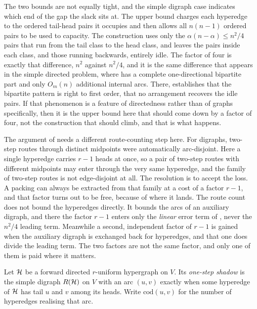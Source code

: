 The two bounds are not equally tight, and the simple digraph case indicates
which end of the gap the slack sits at. The upper bound charges each hyperedge
to the ordered tail-head pairs it occupies and then allows all $n(n-1)$ ordered pairs to be used to
capacity. The construction uses only the $\alpha(n-\alpha) \le n^2/4$ pairs that
run from the tail class to the head class, and leaves the pairs inside each
class, and those running backwards, entirely idle. The factor of four is exactly
that difference, $n^2$ against $n^2/4$, and it is the same difference that
appears in the simple directed problem, where 
has a complete one-directional bipartite part and only $O_m(n)$ additional internal arcs. There, 
establishes that the bipartite pattern is right to first order, that no
arrangement recovers the idle pairs. If that phenomenon is a feature of
directedness rather than of graphs specifically, then it is the upper bound here
that should come down by a factor of four, not the construction that should
climb, and that is what happens.

The argument of  needs a different route-counting step here.
For digraphs, two-step routes through distinct midpoints were
automatically arc-disjoint. Here a single hyperedge carries $r-1$ heads at once,
so a pair of two-step routes with different midpoints may enter through the very
same hyperedge, and the family of two-step routes is not edge-disjoint at all. The
resolution is to accept the loss. A packing can always be extracted from that
family at a cost of a factor $r-1$, and that factor turns out to be free, because
of where it lands. The route count does not bound the hyperedges directly. It
bounds the arcs of an auxiliary digraph, and there the factor $r-1$ enters only
the \emph{linear} error term of , never the $n^2/4$
leading term. Meanwhile a second, independent factor of $r-1$ is gained when the
auxiliary digraph is exchanged back for hyperedges, and that one does divide the
leading term. The two factors are not the same factor, and only one of them is
paid where it matters.

\begin{definition}\label{def:one-step-shadow}
Let $\mathcal{H}$ be a forward directed $r$-uniform hypergraph on $V$. Its
\emph{one-step shadow} is the simple digraph $R(\mathcal{H})$ on $V$ with an arc $(u,v)$
exactly when some hyperedge of $\mathcal{H}$ has tail $u$ and $v$ among its heads. Write
$\mathrm{cod}(u,v)$ for the number of hyperedges realising that arc.
\end{definition}

